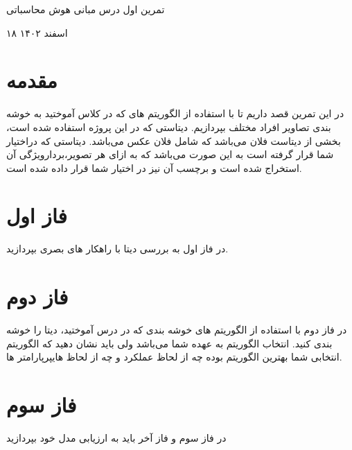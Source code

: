 \documentclass{article}
\begin{document}
	\begin{centering}
		\LARGE
		تمرین اول درس مبانی هوش محاسباتی \\
		\vspace{1em}
		
	\small
		۱۸ اسفند ۱۴۰۲ \\
	\end{centering}
	\section*{مقدمه}
	در این تمرین قصد داریم تا با استفاده از الگوریتم های  که در کلاس آموختید به خوشه بندی تصاویر افراد مختلف بپردازیم.
	دیتاستی که در این پروژه استفاده شده است، بخشی از دیتاست فلان می‌باشد که شامل فلان عکس می‌باشد. دیتاستی که دراختیار شما قرار گرفته است به این صورت می‌باشد که به ازای هر تصویر،بردارویژگی آن استخراج شده است و برچسب آن نیز در اختیار شما قرار داده شده است.
	
	\section{فاز اول}
	در فاز اول به بررسی دیتا با راهکار های بصری بپردازید.
	
	\section{فاز دوم}
	در فاز دوم با استفاده از الگوریتم های خوشه بندی که در درس آموختید، دیتا را خوشه بندی کنید. انتخاب الگوریتم به عهده شما می‌باشد ولی باید نشان دهید که الگوریتم انتخابی شما بهترین الگوریتم بوده چه از لحاظ عملکرد و چه از لحاظ هایپر‌پارامتر ها.
	\section{فاز سوم}
	در فاز سوم و فاز آخر باید به ارزیابی مدل خود بپردازید
	
	
\end{document}

